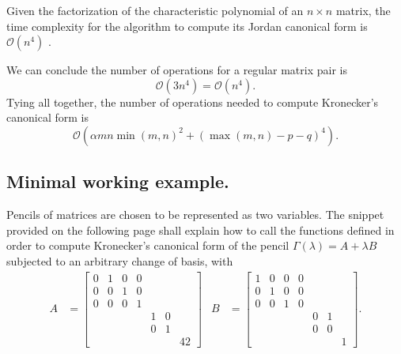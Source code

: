 \begin{remark}
    Given the factorization of the characteristic polynomial of an \(n \times n\) matrix, the time complexity
    for the algorithm to compute its Jordan canonical form is \(\mathcal{O}(n^4)\)
    \cite{DBLP:journals/corr/abs-cs-0412005}.
\end{remark}

We can conclude the number of operations for a regular matrix pair is
\[
    \mathcal{O}(3n^4) = \mathcal{O}(n^4).
\]
Tying all together, the number of operations needed to compute Kronecker's canonical form is
\[
    \mathcal{O}(\alpha mn \min(m, n)^2 + (\max(m, n) - p - q)^4).
\]

\subsection*{Minimal working example.}
Pencils of matrices are chosen to be represented as two variables. The snippet provided on the following page
shall explain how to call the functions defined in order to compute Kronecker's canonical form of the pencil
\(\Gamma(\lambda) = A + \lambda B\) subjected to an arbitrary change of basis, with
\begin{align*}
    A &=
    \begin{bmatrix}
        0 & 1 & 0 & 0 \\
        0 & 0 & 1 & 0 \\
        0 & 0 & 0 & 1 \\
        & & & & 1 & 0 \\
        & & & & 0 & 1 \\
        & & & & & & 42
    \end{bmatrix} &
    B &=
    \begin{bmatrix}
        1 & 0 & 0 & 0 \\
        0 & 1 & 0 & 0 \\
        0 & 0 & 1 & 0 \\
        & & & & 0 & 1 \\
        & & & & 0 & 0 \\
        & & & & & & 1
    \end{bmatrix}.
\end{align*}
\pagebreak
